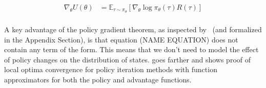 \documentclass{../main.tex}{subfiles}
\begin{document}
\begin{equation}\label{equation:utility-gradient}
\begin{aligned}
\nabla_{\theta} U(\theta) & = \mathbb{E}_{\tau \sim \pi_{\theta}} [\nabla_{\theta} \log \pi_{\theta}(\tau) R(\tau)] \\
\end{aligned}
\end{equation}

A key advantage of the policy gradient theorem, as inspected by~\cite{Sutton1999} (and formalized in the Appendix Section), is that equation (NAME EQUATION) does not contain any term of the form. This means that we don't need to model the effect of policy changes on the distribution of states. \citep{Sutton1999} goes farther and shows proof of local optima convergence for policy iteration methods with function approximators for both the policy and advantage functions.
\end{document}
